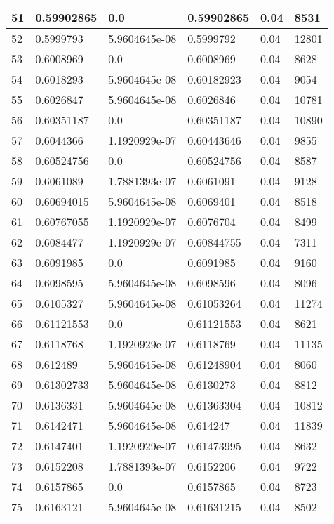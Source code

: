 \begin{longtable}{|l|l|l|l|l|l|}
51 & 0.59902865 & 0.0 & 0.59902865 & 0.04 & 8531 \\ \hline 
52 & 0.5999793 & 5.9604645e-08 & 0.5999792 & 0.04 & 12801 \\ \hline 
53 & 0.6008969 & 0.0 & 0.6008969 & 0.04 & 8628 \\ \hline 
54 & 0.6018293 & 5.9604645e-08 & 0.60182923 & 0.04 & 9054 \\ \hline 
55 & 0.6026847 & 5.9604645e-08 & 0.6026846 & 0.04 & 10781 \\ \hline 
56 & 0.60351187 & 0.0 & 0.60351187 & 0.04 & 10890 \\ \hline 
57 & 0.6044366 & 1.1920929e-07 & 0.60443646 & 0.04 & 9855 \\ \hline 
58 & 0.60524756 & 0.0 & 0.60524756 & 0.04 & 8587 \\ \hline 
59 & 0.6061089 & 1.7881393e-07 & 0.6061091 & 0.04 & 9128 \\ \hline 
60 & 0.60694015 & 5.9604645e-08 & 0.6069401 & 0.04 & 8518 \\ \hline 
61 & 0.60767055 & 1.1920929e-07 & 0.6076704 & 0.04 & 8499 \\ \hline 
62 & 0.6084477 & 1.1920929e-07 & 0.60844755 & 0.04 & 7311 \\ \hline 
63 & 0.6091985 & 0.0 & 0.6091985 & 0.04 & 9160 \\ \hline 
64 & 0.6098595 & 5.9604645e-08 & 0.6098596 & 0.04 & 8096 \\ \hline 
65 & 0.6105327 & 5.9604645e-08 & 0.61053264 & 0.04 & 11274 \\ \hline 
66 & 0.61121553 & 0.0 & 0.61121553 & 0.04 & 8621 \\ \hline 
67 & 0.6118768 & 1.1920929e-07 & 0.6118769 & 0.04 & 11135 \\ \hline 
68 & 0.612489 & 5.9604645e-08 & 0.61248904 & 0.04 & 8060 \\ \hline 
69 & 0.61302733 & 5.9604645e-08 & 0.6130273 & 0.04 & 8812 \\ \hline 
70 & 0.6136331 & 5.9604645e-08 & 0.61363304 & 0.04 & 10812 \\ \hline 
71 & 0.6142471 & 5.9604645e-08 & 0.614247 & 0.04 & 11839 \\ \hline 
72 & 0.6147401 & 1.1920929e-07 & 0.61473995 & 0.04 & 8632 \\ \hline 
73 & 0.6152208 & 1.7881393e-07 & 0.6152206 & 0.04 & 9722 \\ \hline 
74 & 0.6157865 & 0.0 & 0.6157865 & 0.04 & 8723 \\ \hline 
75 & 0.6163121 & 5.9604645e-08 & 0.61631215 & 0.04 & 8502 \\ \hline 
\end{longtable}